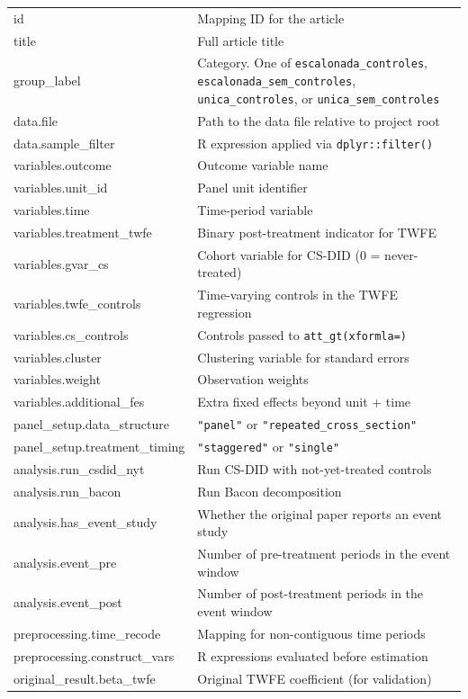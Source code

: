 \begin{longtable}{>{\ttfamily\footnotesize\raggedright}p{6.0cm} >{\small\raggedright\arraybackslash}p{9.0cm}}
id & Mapping ID for the article \\
title & Full article title \\
group\_label & Category. One of \texttt{escalonada\_controles}, \texttt{escalonada\_sem\_controles}, \texttt{unica\_controles}, or \texttt{unica\_sem\_controles} \\
data.file & Path to the data file relative to project root \\
data.sample\_filter & R expression applied via \texttt{dplyr::filter()} \\[3pt]
variables.outcome & Outcome variable name \\
variables.unit\_id & Panel unit identifier \\
variables.time & Time-period variable \\
variables.treatment\_twfe & Binary post-treatment indicator for TWFE \\
variables.gvar\_cs & Cohort variable for CS-DID (0 = never-treated) \\
variables.twfe\_controls & Time-varying controls in the TWFE regression \\
variables.cs\_controls & Controls passed to \texttt{att\_gt(xformla=)} \\
variables.cluster & Clustering variable for standard errors \\
variables.weight & Observation weights \\
variables.additional\_fes & Extra fixed effects beyond unit + time \\[3pt]
panel\_setup.data\_structure & \texttt{"panel"} or \texttt{"repeated\_cross\_section"} \\
panel\_setup.treatment\_timing & \texttt{"staggered"} or \texttt{"single"} \\[3pt]
analysis.run\_csdid\_nyt & Run CS-DID with not-yet-treated controls \\
analysis.run\_bacon & Run Bacon decomposition \\
analysis.has\_event\_study & Whether the original paper reports an event study \\
analysis.event\_pre & Number of pre-treatment periods in the event window \\
analysis.event\_post & Number of post-treatment periods in the event window \\[3pt]
preprocessing.time\_recode & Mapping for non-contiguous time periods \\
preprocessing.construct\_vars & R expressions evaluated before estimation \\[3pt]
original\_result.beta\_twfe & Original TWFE coefficient (for validation) \\

\end{longtable}

